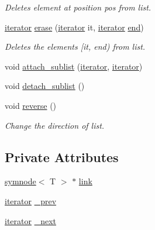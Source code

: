 \begin{DoxyCompactItemize}
\begin{DoxyCompactList}\small\item\em Deletes element at position {\ttfamily pos} from list. \end{DoxyCompactList}\item 
\mbox{\hyperlink{classsymlist_a66045fbe3d98975e5537092ede8b50df}{iterator}} \mbox{\hyperlink{classsymlist_a53128defa9aedb016affcfa27bf201da}{erase}} (\mbox{\hyperlink{classsymlist_a66045fbe3d98975e5537092ede8b50df}{iterator}} it, \mbox{\hyperlink{classsymlist_a66045fbe3d98975e5537092ede8b50df}{iterator}} \mbox{\hyperlink{classsymlist_a7283589fa01f79d722f8256d7a6a7883}{end}})
\begin{DoxyCompactList}\small\item\em Deletes the elements {\ttfamily \mbox{[}it, end)} from list. \end{DoxyCompactList}\item 
void \mbox{\hyperlink{classsymlist_a526206a1d6fd2f2cef9f73ec499b6315}{attach\+\_\+sublist}} (\mbox{\hyperlink{classsymlist_a66045fbe3d98975e5537092ede8b50df}{iterator}}, \mbox{\hyperlink{classsymlist_a66045fbe3d98975e5537092ede8b50df}{iterator}})
\item 
void \mbox{\hyperlink{classsymlist_a784f81bf9dfbfc1865f188a82681779f}{detach\+\_\+sublist}} ()
\item 
void \mbox{\hyperlink{classsymlist_ae22b65101604c694e96974cc9579ab78}{reverse}} ()
\begin{DoxyCompactList}\small\item\em Change the direction of list. \end{DoxyCompactList}\end{DoxyCompactItemize}
\subsection*{Private Attributes}
\begin{DoxyCompactItemize}
\item 
\mbox{\hyperlink{structsymnode}{symnode}}$<$ T $>$ $\ast$ \mbox{\hyperlink{classsymlist_a8fa81a7f6d0bb986bb593776db582c90}{link}}
\item 
\mbox{\hyperlink{classsymlist_a66045fbe3d98975e5537092ede8b50df}{iterator}} \mbox{\hyperlink{classsymlist_ac5e2276db5018abebf297079a324ed9e}{\+\_\+prev}}
\item 
\mbox{\hyperlink{classsymlist_a66045fbe3d98975e5537092ede8b50df}{iterator}} \mbox{\hyperlink{classsymlist_a376c701eae20490b74a6866124bcb24c}{\+\_\+next}}
\end{DoxyCompactItemize}


